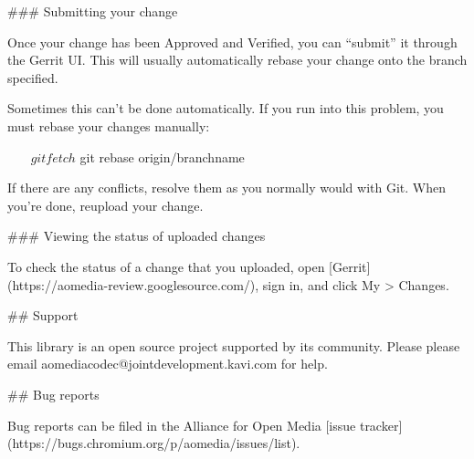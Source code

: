\begin{DoxyCodeInclude}
### Submitting your change

Once your change has been Approved and Verified, you can “submit” it through the
Gerrit UI. This will usually automatically rebase your change onto the branch
specified.

Sometimes this can’t be done automatically. If you run into this problem, you
must rebase your changes manually:

~~~
    $ git fetch
    $ git rebase origin/branchname
~~~

If there are any conflicts, resolve them as you normally would with Git. When
you’re done, reupload your change.

### Viewing the status of uploaded changes

To check the status of a change that you uploaded, open
[Gerrit](https://aomedia-review.googlesource.com/), sign in, and click My >
Changes.

## Support

This library is an open source project supported by its community. Please
please email aomediacodec@jointdevelopment.kavi.com for help.

## Bug reports

Bug reports can be filed in the Alliance for Open Media
[issue tracker](https://bugs.chromium.org/p/aomedia/issues/list).
\end{DoxyCodeInclude}
 